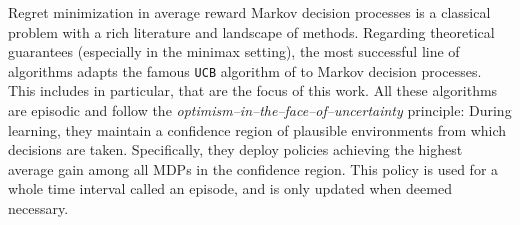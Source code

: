 \documentclass[preprint,cleveref,12pt]{colt2025}
\begin{document}
    Regret minimization in average reward Markov decision processes is a classical problem with a rich literature and landscape of methods. 
    Regarding theoretical guarantees (especially in the minimax setting), the most successful line of algorithms adapts the famous \texttt{UCB} algorithm of \cite{auer_using_2002} to Markov decision processes. 
    This includes \cite{auer_logarithmic_2006,tewari_optimistic_2007,auer_near_optimal_2009,bartlett_regal_2009,filippi_optimism_2010,fruit_efcient_2018,tossou_near_optimal_2019,fruit_improved_2020,bourel_tightening_2020,zhang_regret_2019,boone_achieving_2024} in particular, that are the focus of this work. 
    All these algorithms are episodic and follow the \emph{optimism--in--the--face--of--uncertainty} principle:
    During learning, they maintain a confidence region of plausible environments from which decisions are taken. 
    Specifically, they deploy policies achieving the highest average gain among all MDPs in the confidence region.
    This policy is used for a whole time interval called an episode, and is only updated when deemed necessary. 
\end{document}
